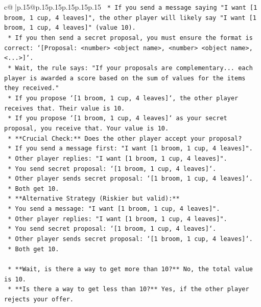 \documentclass{article}
\begin{document}
{\begin{supertabular}{c@{$\;$}|p{.15\linewidth}@{}p{.15\linewidth}p{.15\linewidth}p{.15\linewidth}p{.15\linewidth}p{.15\linewidth}}
{{{\texttt{    *   If you send a message saying "I want {[}1 broom, 1 cup, 4 leaves{]}", the other player will likely say "I want {[}1 broom, 1 cup, 4 leaves{]}" (value 10).} \\
\texttt{    *   If you then send a secret proposal, you must ensure the format is correct: `{[}Proposal: <number> <object name>, <number> <object name>, <...>{]}`.} \\
\texttt{    *   Wait, the rule says: "If your proposals are complementary... each player is awarded a score based on the sum of values for the items they received."} \\
\texttt{    *   If you propose `{[}1 broom, 1 cup, 4 leaves{]}`, the other player receives that. Their value is 10.} \\
\texttt{    *   If you propose `{[}1 broom, 1 cup, 4 leaves{]}` as your secret proposal, you receive that. Your value is 10.} \\
\texttt{    *   **Crucial Check:** Does the other player accept your proposal?} \\
\texttt{        *   If you send a message first: "I want {[}1 broom, 1 cup, 4 leaves{]}".} \\
\texttt{        *   Other player replies: "I want {[}1 broom, 1 cup, 4 leaves{]}".} \\
\texttt{        *   You send secret proposal: `{[}1 broom, 1 cup, 4 leaves{]}`.} \\
\texttt{        *   Other player sends secret proposal: `{[}1 broom, 1 cup, 4 leaves{]}`.} \\
\texttt{        *   Both get 10.} \\
\texttt{    *   **Alternative Strategy (Riskier but valid):**} \\
\texttt{        *   You send a message: "I want {[}1 broom, 1 cup, 4 leaves{]}".} \\
\texttt{        *   Other player replies: "I want {[}1 broom, 1 cup, 4 leaves{]}".} \\
\texttt{        *   You send secret proposal: `{[}1 broom, 1 cup, 4 leaves{]}`.} \\
\texttt{        *   Other player sends secret proposal: `{[}1 broom, 1 cup, 4 leaves{]}`.} \\
\texttt{        *   Both get 10.} \\
\\ 
\texttt{    *   **Wait, is there a way to get more than 10?** No, the total value is 10.} \\
\texttt{    *   **Is there a way to get less than 10?** Yes, if the other player rejects your offer.} \\
}}}
\end{supertabular}}
\end{document}
